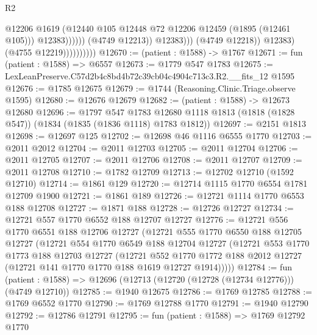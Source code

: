 \begin{lexlean}{R2}
\begin{coremodule}
                                              @12206
                                              @1619
                                              (@12440
                                                @105
                                                @12448
                                                @72
                                                @12206
                                                @12459
                                                (@1895 (@12461 @105)))
                                              @12383))))))
                                  (@4749 @12213))
                                @12383)))
                          (@4749 @12218))
                        @12383)
                      (@4755 @12219))))))))))
@12670 := (patient : @1588) -> @1767
@12671 := fun (patient : @1588) => @6557
@12673 := @1779 @547 @1783
@12675 := LexLeanPreserve.C57d2b4c8bd4b72c39cb04c4904c713c3.R2.__fits_12 @1595
@12676 := @1785 @12675
@12679 := @1744 (Reasoning.Clinic.Triage.observe @1595)
@12680 := @12676 @12679
@12682 := (patient : @1588) -> @12673 @12680
@12696 := @1797
    @547
    @1783
    @12680
    @1118
    @1813
    (@1818 (@1828 @547))
    (@1834 (@1835 (@1836 @1118) @1783 @1812))
@12697 := @2151 @1813
@12698 := @12697 @125
@12702 := @12698 @46 @1116 @6555 @1770
@12703 := @2011 @2012
@12704 := @2011 @12703
@12705 := @2011 @12704
@12706 := @2011 @12705
@12707 := @2011 @12706
@12708 := @2011 @12707
@12709 := @2011 @12708
@12710 := @1782 @12709
@12713 := @12702 @12710 (@1592 @12710)
@12714 := @1861 @129
@12720 := @12714 @1115 @1770 @6554 @1781 @12709 @1900
@12721 := @1861 @189
@12726 := @12721 @1114 @1770 @6553 @188 @12708
@12727 := @1871 @188
@12728 := @12726 @12727
@12734 := @12721 @557 @1770 @6552 @188 @12707 @12727
@12776 := @12721
    @556
    @1770
    @6551
    @188
    @12706
    @12727
    (@12721
      @555
      @1770
      @6550
      @188
      @12705
      @12727
      (@12721
        @554
        @1770
        @6549
        @188
        @12704
        @12727
        (@12721
          @553
          @1770
          @1773
          @188
          @12703
          @12727
          (@12721
            @552
            @1770
            @1772
            @188
            @2012
            @12727
            (@12721 @141 @1770 @1770 @188 @1619 @12727 @1914)))))
@12784 := fun (patient : @1588) => @12696 (@12713 (@12720 (@12728 (@12734 @12776))) (@4749 @12710))
@12785 := @1940 @12675
@12786 := @1769 @12785
@12788 := @1769 @6552 @1770
@12790 := @1769 @12788 @1770
@12791 := @1940 @12790
@12792 := @12786 @12791
@12795 := fun (patient : @1588) => @1769 @12792 @1770

\end{coremodule}
\end{lexlean}
